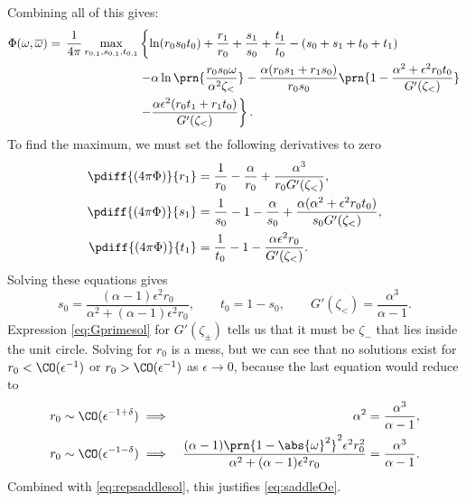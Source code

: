 \documentclass[12pt]{article}
\newcommand{\inv}{^{-1}}
\newcommand{\omb}{\overline{\omega}}
\newcommand{\omo}{\prn{1-\abs{\omega}^2}}
\begin{document}
Combining all of this gives:
%
\begin{equation}\label{eq:phimaxrep}
\begin{aligned}
  \Phi(\omega,\omb) =\, \frac{1}{4\pi} \max_{r_{0,1},s_{0,1},t_{0,1}}& \left\{
    \ln(r_0s_0t_0) + \frac{r_1}{r_0} + \frac{s_1}{s_0} + \frac{t_1}{t_0}
    -(s_0 + s_1 + t_0 + t_1)
    \right.\\&\left.
    - \alpha\ln\prn{\frac{r_0s_0\omega}{\alpha^2\zeta_<}}
    - \frac{\alpha(r_0s_1+r_1s_0)}{r_0s_0}\prn{1-\frac{\alpha^2+\epsilon^2r_0t_0} {G'(\zeta_<)}}
    \right.\\&\left.
    - \frac{ \alpha\epsilon^2 (r_0t_1+r_1t_0)} {G'(\zeta_<)}
    \right\}.
\end{aligned}
\end{equation}
%
To find the maximum, we must set the following derivatives to zero
%
\begin{equation}\label{eq:phidiff1}
\begin{aligned}
  \pdiff{(4\pi\Phi)}{r_1} &= \frac{1}{r_0} - \frac{\alpha}{r_0} + \frac{\alpha^3}{r_0G'(\zeta_<)},  \\
  \pdiff{(4\pi\Phi)}{s_1} &= \frac{1}{s_0} - 1 - \frac{\alpha}{s_0} + \frac{\alpha(\alpha^2+\epsilon^2 r_0 t_0 )}{s_0G'(\zeta_<)},  \\
  \pdiff{(4\pi\Phi)}{t_1} &= \frac{1}{t_0} - 1 - \frac{\alpha\epsilon^2r_0}{G'(\zeta_<)}.
\end{aligned}
\end{equation}
%
Solving these equations gives
%
\begin{equation}\label{eq:repsaddlesol}
  s_0 = \frac{(\alpha-1)\epsilon^2r_0}{\alpha^2+(\alpha-1)\epsilon^2r_0}, \qquad
  t_0 = 1 - s_0,\qquad
  G'(\zeta_<) = \frac{\alpha^3}{\alpha-1}.
\end{equation}
%
Expression \eqref{eq:Gprimesol} for $G'(\zeta_\pm)$ tells us that it must be $\zeta_-$ that lies inside the unit circle.
Solving for $r_0$ is a mess, but we can see that no solutions exist for $r_0<\CO(\epsilon\inv)$ or $r_0>\CO(\epsilon\inv)$ as $\epsilon\to0$, because the last equation would reduce to
\begin{equation}\label{eq:rOe}
\begin{aligned}
  r_0 &\sim \CO(\epsilon^{-1+\delta})
   \implies &
   \alpha^2 &= \frac{\alpha^3}{\alpha-1}, \\
  r_0 &\sim \CO(\epsilon^{-1-\delta})
   \implies &
   \frac{(\alpha-1)\omo^2\epsilon^2r_0^2}{\alpha^2+(\alpha-1)\epsilon^2r_0} &= \frac{\alpha^3}{\alpha-1}. \\
\end{aligned}
\end{equation}
%
Combined with \eqref{eq:repsaddlesol}, this justifies \eqref{eq:saddleOe}.
\end{document}
